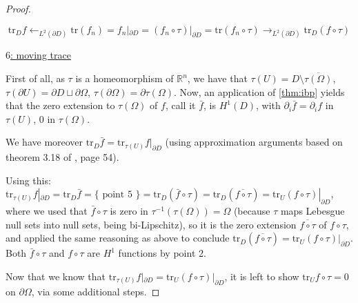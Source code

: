 \documentclass[english,a4paper,10pt,oneside]{scrbook}	%
\theoremstyle{break}
\newenvironment{mproof}[1][\proofname]{%
  \begin{proof}[#1]$ $\par\nobreak\ignorespaces
}{%
  \end{proof}
}
\renewcommand*{\proofname}{Proof}
\theoremstyle{remark}
\newcommand{\mR}{\mathbb{R}}
\newcommand{\tr}{\text{tr}}
\newcommand{\ind}[1]{\{\text{ #1 }\}}
\begin{document}
\begin{appendices}
\begin{mproof}
$$\tr_D f \leftarrow_{L^2(\partial D)}\tr(f_n) = f_n|_{\partial D} = (f_n\circ \tau)|_{\partial D}= \tr(f_n \circ \tau)\rightarrow_{L^2(\partial D)} \tr_D(f \circ \tau)$$

\underline{$6$: moving trace}

First of all, as $\tau$ is a homeomorphism of $\mR^{n}$, we have that $\tau (U)=D\setminus \overline{\tau(\Omega)}$, $\tau(\partial U) = \partial D \sqcup \partial \Omega$, $\tau(\partial \Omega) = \partial \tau (\Omega)$.
%
Now, an application of \cref{thm:ibp} yields that the zero extension to $\tau(\Omega)$ of $f$, call it $\bar{f}$, is $H^1(D)$, with $\partial_i \bar{f}=\partial_i f$ in $\tau( U)$, $0$ in $\tau(\Omega)$.

We have moreover $\tr_D \bar{f} = \tr_{\tau(U)} f|_{\partial D}$ (using approximation arguments based on theorem 3.18 of \cite{adams}, page 54).

Using this: $ \tr_{\tau(U)}f|_{\partial D} = \tr_D \bar{f} = \ind{point 5} = \tr_D(\bar{f}\circ \tau) = \tr_D(\overline{f \circ \tau}) = \tr_U (f\circ \tau)|_{\partial D}$, where we used that $\bar{f}\circ \tau$ is zero in $\tau^{-1}(\tau(\Omega)) = \Omega$ (because $\tau$ maps Lebesgue null sets into null sets, being bi-Lipschitz), so it is the zero extension $\overline{f \circ \tau}$ of $f\circ \tau$, and applied the same reasoning as above to conclude $\tr_D(\overline{f \circ \tau}) = \tr_U (f\circ \tau)|_{\partial D}$. Both $\bar{f}\circ \tau$ and $f\circ \tau$ are $H^1$ functions by point 2.

Now that we know that $ \tr_{\tau(U)}f|_{\partial D}  = \tr_U (f\circ \tau)|_{\partial D}$, it is left to show $\tr_U f\circ \tau=0 $ on $\partial \Omega$, via some additional steps.

%


\end{mproof}
\end{appendices}
\end{document}
